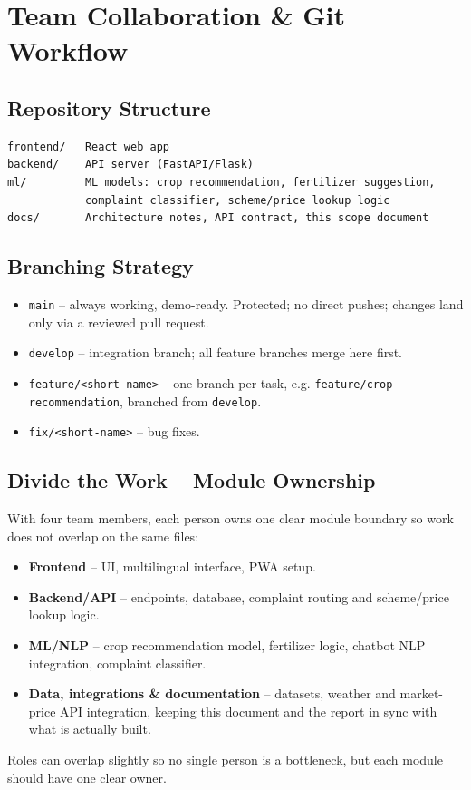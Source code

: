 \documentclass[11pt,a4paper]{article}
\begin{document}
\section{Team Collaboration \& Git Workflow}

\subsection{Repository Structure}
\begin{verbatim}
frontend/   React web app
backend/    API server (FastAPI/Flask)
ml/         ML models: crop recommendation, fertilizer suggestion,
            complaint classifier, scheme/price lookup logic
docs/       Architecture notes, API contract, this scope document
\end{verbatim}

\subsection{Branching Strategy}
\begin{itemize}[leftmargin=*]
  \item \texttt{main} -- always working, demo-ready. Protected; no direct
    pushes; changes land only via a reviewed pull request.
  \item \texttt{develop} -- integration branch; all feature branches
    merge here first.
  \item \texttt{feature/<short-name>} -- one branch per task, e.g.
    \texttt{feature/crop-recommendation}, branched from \texttt{develop}.
  \item \texttt{fix/<short-name>} -- bug fixes.
\end{itemize}

\subsection{Divide the Work -- Module Ownership}
With four team members, each person owns one clear module boundary so
work does not overlap on the same files:
\begin{itemize}[leftmargin=*]
  \item \textbf{Frontend} -- UI, multilingual interface, PWA setup.
  \item \textbf{Backend/API} -- endpoints, database, complaint routing
    and scheme/price lookup logic.
  \item \textbf{ML/NLP} -- crop recommendation model, fertilizer logic,
    chatbot NLP integration, complaint classifier.
  \item \textbf{Data, integrations \& documentation} -- datasets, weather
    and market-price API integration, keeping this document and the
    report in sync with what is actually built.
\end{itemize}
Roles can overlap slightly so no single person is a bottleneck, but each
module should have one clear owner.
\end{document}
